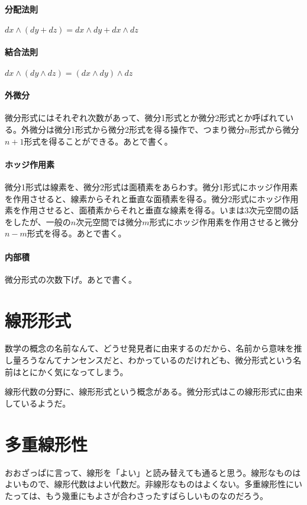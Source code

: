 \paragraph{分配法則}

$ d x \wedge ( d y + d z ) = d x \wedge d y + d x \wedge d z $

\paragraph{結合法則}

$ d x \wedge (d y \wedge d z) = (d x \wedge d y) \wedge d z $

\paragraph{外微分}

微分形式にはそれぞれ次数があって、微分1形式とか微分2形式とか呼ばれている。外微分は微分1形式から微分2形式を得る操作で、つまり微分$n$形式から微分$n+1$形式を得ることができる。あとで書く。

\paragraph{ホッジ作用素}

微分1形式は線素を、微分2形式は面積素をあらわす。微分1形式にホッジ作用素を作用させると、線素からそれと垂直な面積素を得る。微分2形式にホッジ作用素を作用させると、面積素からそれと垂直な線素を得る。いまは3次元空間の話をしたが、一般の$n$次元空間では微分$m$形式にホッジ作用素を作用させると微分$n-m$形式を得る。あとで書く。

\paragraph{内部積}

微分形式の次数下げ。あとで書く。


\section{線形形式}

数学の概念の名前なんて、どうせ発見者に由来するのだから、名前から意味を推し量ろうなんてナンセンスだと、わかっているのだけれども、微分形式という名前はとにかく気になってしまう。

線形代数の分野に、線形形式という概念がある。微分形式はこの線形形式に由来しているようだ。

\newpage


\section{多重線形性}

おおざっぱに言って、線形を「よい」と読み替えても通ると思う。線形なものはよいもので、線形代数はよい代数だ。非線形なものはよくない。多重線形性にいたっては、もう幾重にもよさが合わさったすばらしいものなのだろう。

\newpage

\newpage

